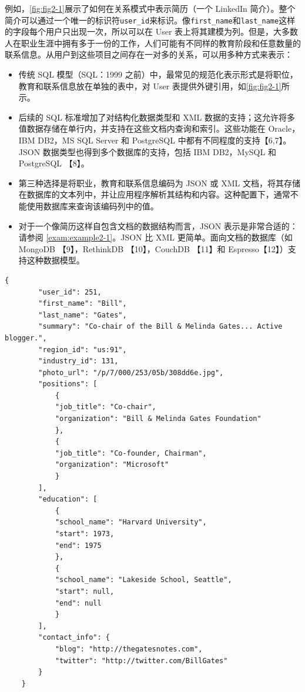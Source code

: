 例如，\autoref{fig:fig2-1}展示了如何在关系模式中表示简历（一个 LinkedIn 简介）。整个简介可以通过一个唯一的标识符\texttt{user\_id}来标识。像\texttt{first\_name}和\texttt{last\_name}这样的字段每个用户只出现一次，所以可以在 User 表上将其建模为列。但是，大多数人在职业生涯中拥有多于一份的工作，人们可能有不同样的教育阶段和任意数量的联系信息。从用户到这些项目之间存在一对多的关系，可以用多种方式来表示：

\begin{itemize}
    \item 传统 SQL 模型（SQL：1999 之前）中，最常见的规范化表示形式是将职位，教育和联系信息放在单独的表中，对 User 表提供外键引用，如\autoref{fig:fig2-1}所示。
    \item 后续的 SQL 标准增加了对结构化数据类型和 XML 数据的支持；这允许将多值数据存储在单行内，并支持在这些文档内查询和索引。这些功能在 Oracle，IBM DB2，MS SQL Server 和 PostgreSQL 中都有不同程度的支持【6,7】。JSON 数据类型也得到多个数据库的支持，包括 IBM DB2，MySQL 和 PostgreSQL 【8】。
    \item 第三种选择是将职业，教育和联系信息编码为 JSON 或 XML 文档，将其存储在数据库的文本列中，并让应用程序解析其结构和内容。这种配置下，通常不能使用数据库来查询该编码列中的值。
    \item 对于一个像简历这样自包含文档的数据结构而言，JSON 表示是非常合适的：请参阅 \autoref{exam:example2-1}。JSON 比 XML 更简单。面向文档的数据库（如 MongoDB 【9】，RethinkDB 【10】，CouchDB 【11】和 Espresso【12】）支持这种数据模型。
\end{itemize}

\label{exam:example2-1}
\begin{lstlisting}[caption={用 JSON 文档表示一个 LinkedIn 简介}, breaklines]
    {
        "user_id": 251,
        "first_name": "Bill",
        "last_name": "Gates",
        "summary": "Co-chair of the Bill & Melinda Gates... Active blogger.",
        "region_id": "us:91",
        "industry_id": 131,
        "photo_url": "/p/7/000/253/05b/308dd6e.jpg",
        "positions": [
            {
            "job_title": "Co-chair",
            "organization": "Bill & Melinda Gates Foundation"
            },
            {
            "job_title": "Co-founder, Chairman",
            "organization": "Microsoft"
            }
        ],
        "education": [
            {
            "school_name": "Harvard University",
            "start": 1973,
            "end": 1975
            },
            {
            "school_name": "Lakeside School, Seattle",
            "start": null,
            "end": null
            }
        ],
        "contact_info": {
            "blog": "http://thegatesnotes.com",
            "twitter": "http://twitter.com/BillGates"
        }
    }
\end{lstlisting}

